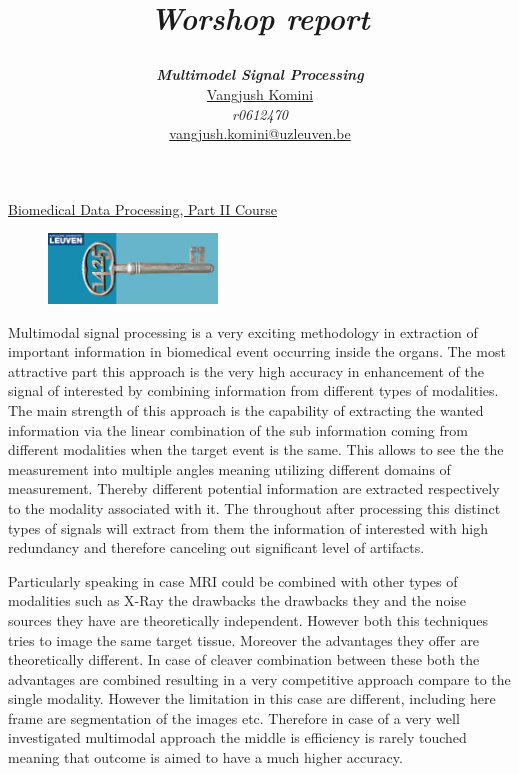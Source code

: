 \documentclass[a4paper]{article}
\title{\centerline{\textit{Worshop report}} }
\author{\textbf{\textit{Multimodel Signal Processing}}\\
\href{mailto:vangjush.komini@uzleuven.be}{Vangjush Komini}\\  \textit{r0612470} \\
\href{mailto:vangjush.komini@uzleuven.be}{vangjush.komini@uzleuven.be}\\
}
\begin{document}
\maketitle
\begin{center}
\Large \href{https://onderwijsaanbod.kuleuven.be/syllabi/e/H06W1AE.htm#activetab=doelstellingen_idp41200}{Biomedical Data Processing, Part II Course}
\end{center}

\begin{figure}[!htbp]
\centering
\includegraphics[width=0.4\textwidth]{icon1.png}
\end{figure}



\newpage



Multimodal signal processing is a very exciting methodology in extraction of important information in biomedical event occurring inside the organs. The most attractive part this approach is the very high accuracy in enhancement of the signal of interested by combining information from different types of modalities. The main strength of this approach is the capability of extracting the wanted information via the linear combination of the sub information coming from different modalities when the target event is the same. This allows to see the the measurement into multiple angles meaning utilizing different domains of measurement. Thereby different potential information are extracted respectively to the modality associated with it. The throughout after processing this distinct types of signals will extract from them the information of interested with high redundancy and therefore canceling out significant level of artifacts. 

Particularly speaking in case MRI could be combined with other types of modalities such as X-Ray the drawbacks the drawbacks they and the noise sources they have are theoretically independent. However both this techniques tries to image the same target tissue. Moreover the advantages they offer are theoretically different. In case of cleaver combination between these both the advantages are combined resulting in a very competitive approach compare to the single modality. However the limitation in this case are different, including here frame are segmentation of the images etc. Therefore in case of a very well investigated multimodal approach the middle is efficiency is rarely touched meaning that outcome is aimed to have a much higher accuracy.
\end{document}
